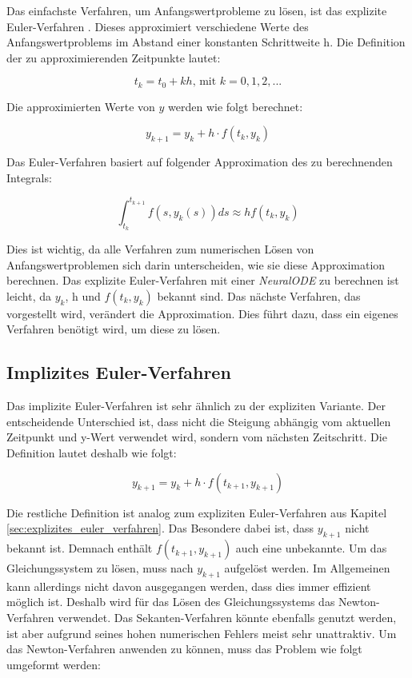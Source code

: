 
Das einfachste Verfahren, um Anfangswertprobleme zu lösen, ist das explizite Euler-Verfahren \cite[Kapitel~II.1]{ode1}.
Dieses approximiert verschiedene Werte des Anfangswertproblems 
im Abstand einer konstanten Schrittweite h.
Die Definition der zu approximierenden Zeitpunkte lautet:

$$
t_k = t_0 + kh \text{, mit } k = 0, 1, 2, ...
$$

Die approximierten Werte von $y$ werden wie folgt berechnet:

$$
y_{k + 1} = y_{k} + h \cdot f(t_k, y_k)
$$

Das Euler-Verfahren basiert auf folgender Approximation des zu berechnenden Integrals:

$$
\int_{t_k}^{t_{k+1}} f(s, y_k(s)) ds \approx h f(t_k, y_k)
$$

Dies ist wichtig, da alle Verfahren zum numerischen Lösen von Anfangswertproblemen sich darin unterscheiden, wie sie diese Approximation berechnen.
Das explizite Euler-Verfahren mit einer \textit{NeuralODE} zu berechnen
ist leicht, da $y_k$, h und $f(t_k, y_k)$ bekannt sind.
Das nächste Verfahren, das vorgestellt wird, verändert die Approximation.
Dies führt dazu, dass ein eigenes Verfahren benötigt wird, um diese zu lösen.

\subsection{Implizites Euler-Verfahren}

Das implizite Euler-Verfahren  \cite[Kapitel~II.7]{ode1} ist sehr ähnlich zu der expliziten Variante.
Der entscheidende Unterschied ist, dass nicht die Steigung abhängig vom aktuellen 
Zeitpunkt und y-Wert verwendet wird, sondern vom nächsten Zeitschritt.
Die Definition lautet deshalb wie folgt:

$$
y_{k + 1} = y_k + h \cdot f(t_{k + 1}, y_{k + 1})
$$

Die restliche Definition ist analog zum expliziten Euler-Verfahren aus Kapitel \ref{sec:explizites_euler_verfahren}.
Das Besondere dabei ist, dass $y_{k + 1}$ nicht bekannt ist.
Demnach enthält $f(t_{k + 1}, y_{k + 1})$ auch eine unbekannte.
Um das Gleichungssystem zu lösen, muss nach $y_{k + 1}$ aufgelöst werden.
Im Allgemeinen kann allerdings nicht davon ausgegangen werden, dass dies immer effizient möglich ist.
Deshalb wird für das Lösen des Gleichungssystems das Newton-Verfahren \cite[Kapitel~5.5]{intorduction_to_numerical_analysis} verwendet.
Das Sekanten-Verfahren \cite[Kaptiel~18.2]{HankeBourgeois.2002} könnte ebenfalls genutzt werden, ist aber aufgrund seines hohen numerischen 
Fehlers meist sehr unattraktiv.
Um das Newton-Verfahren anwenden zu können, muss das Problem wie folgt umgeformt werden:

